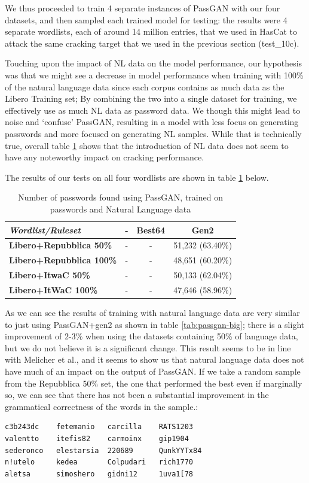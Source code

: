 We thus proceeded to train 4 separate instances of PassGAN with our four datasets, and then sampled each trained model for testing: the results were 4 separate wordlists, each of around 14 million entries, that we used in HasCat to attack the same cracking target that we used in the previous section (test\_10c).

Touching upon the impact of NL data on the model performance, our hypothesis was that we might see a decrease in model performance when training with 100\% of the natural language data since each corpus contains as much data as the Libero Training set; By combining the two into a single dataset for training, we effectively use as much NL data as password data.  We though this might lead to noise and ‘confuse’ PassGAN, resulting in a model with less focus on generating passwords and more focused on generating NL samples. While that is technically true, overall table \ref{tab:nl-results} shows that the introduction of NL data does not seem to have any noteworthy impact on cracking performance.

The results of our tests on all four wordlists are shown in table \ref{tab:nl-results} below.

\begin{table}[H]
\centering
\begin{tabular}{|l|c|c|c|}
\hline
 \textbf{\emph{Wordlist/Ruleset}} & \textbf{-} & \textbf{Best64} & \textbf{Gen2} \\ \hline
 \textbf{Libero+Repubblica 50\%} & - & - & 51,232 (63.40\%) \\ \hline
 \textbf{Libero+Repubblica 100\%} & - & - &  48,651 (60.20\%) \\ \hline
 \textbf{Libero+ItwaC 50\%} & - & - &  50,133 (62.04\%) \\ \hline
 \textbf{Libero+ItWaC 100\%} & - & - &  47,646 (58.96\%) \\ \hline
\end{tabular}
\caption{Number of passwords found using PassGAN, trained on passwords and Natural Language data}
\label{tab:nl-results}
\end{table}

As we can see the results of training with natural language data are very similar to just using PassGAN+gen2 as shown in table \ref{tab:passgan-big}; there is a slight improvement of 2-3\% when using the datasets containing 50\% of language data, but we do not believe it is a significant change. This result seems to be in line with Melicher et al.\cite{Melicher2016}, and it seems to show us that natural language data does not have much of an impact on the output of PassGAN. 
If we take a random sample from the Repubblica 50\% set, the one that performed the best even if marginally so, we can see that there has not been a substantial improvement in the grammatical correctness of the words in the sample.:
\begin{verbatim}
c3b243dc    fetemanio   carcilla    RATS1203
valentto    itefis82    carmoinx    gip1904
sederonco   elestarsia  220689      QunkYYTx84
n!utelo     kedea       Colpudari   rich1770
aletsa      simoshero   gidni12     1uva1[78
\end{verbatim}    

